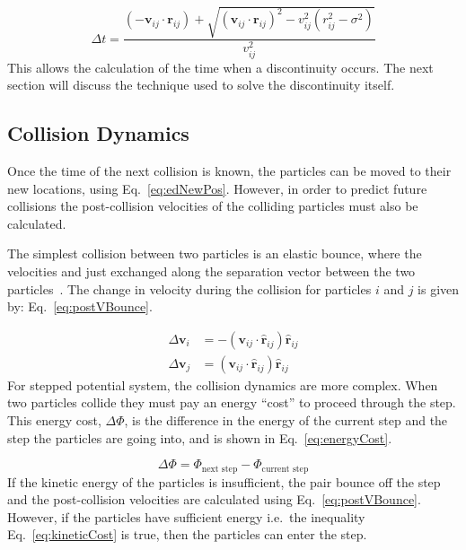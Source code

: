 \documentclass[12pt]{UoAthesis} \usepackage{booktabs}
\begin{document}
\begin{equation}
  \label{eq:collExitTime}
\Delta t = \frac{(-\mathbf{v}_{ij}\cdot\mathbf{r}_{ij}) +
  \sqrt{(\mathbf{v}_{ij}\cdot\mathbf{r}_{ij})^2 - v_{ij}^2(r_{ij}^2 - \sigma^2)}}
     {v_{ij}^2}
\end{equation}
This allows the calculation of the time when a discontinuity occurs.
The next section will discuss the technique used to solve the
discontinuity itself.

\subsection{Collision Dynamics \label{sec:CollDyn}}
Once the time of the next collision is known, the particles can be
moved to their new locations, using Eq.~\eqref{eq:edNewPos}. However,
in order to predict future collisions the post-collision velocities of
the colliding particles must also be calculated.  

The simplest collision between two particles is an elastic bounce,
where the velocities and just exchanged along the separation vector
between the two particles~\cite{Haile1997}.  The change in velocity
during the collision for particles $i$ and $j$ is given by:
Eq.~\eqref{eq:postVBounce}.

\begin{subequations}
  \label{eq:postVBounce}
  \begin{align}
    \Delta\mathbf{v}_i &= -(\mathbf{v}_{ij}\cdot\mathbf{\hat{r}}_{ij})\mathbf{\hat{r}}_{ij} \\
    \Delta\mathbf{v}_j &= (\mathbf{v}_{ij}\cdot\mathbf{\hat{r}}_{ij})\mathbf{\hat{r}}_{ij}
  \end{align}
\end{subequations}
For stepped potential system, the collision dynamics are more complex.
When two particles collide they must pay an energy ``cost'' to proceed
through the step.  This energy cost, $\Delta \Phi$, is the difference in
the energy of the current step and the step the particles are going
into, and is shown in Eq.~\eqref{eq:energyCost}.

\begin{equation}
  \label{eq:energyCost}
  \Delta \Phi = \Phi_{\text{next step}} - \Phi_{\text{current step}}
\end{equation}
If the kinetic energy of the particles is insufficient,
the pair bounce off the step and the post-collision velocities are
calculated using Eq.~\eqref{eq:postVBounce}. However, if the particles
have sufficient energy i.e.\ the inequality Eq.~\eqref{eq:kineticCost}
is true, then the particles can enter the step.
\end{document}
